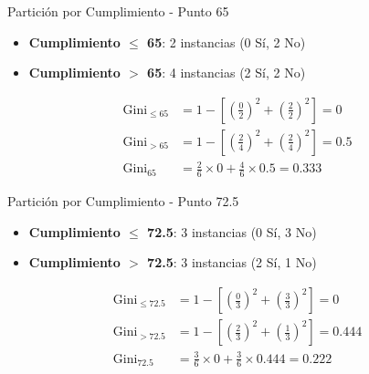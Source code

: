 \documentclass{beamer}
\begin{document}
\begin{frame}{Partición por Cumplimiento - Punto 65}
    \begin{itemize}
        \item \textbf{Cumplimiento $\leq$ 65}: 2 instancias (0 Sí, 2 No)
        \item \textbf{Cumplimiento $>$ 65}: 4 instancias (2 Sí, 2 No)
    \end{itemize}
    
    \vspace{0.5em}
    
    \begin{align*}
        \mathrm{Gini}_{\leq 65} &= 1 - \left[\left(\tfrac{0}{2}\right)^2 + \left(\tfrac{2}{2}\right)^2\right] = 0 \\
        \mathrm{Gini}_{> 65} &= 1 - \left[\left(\tfrac{2}{4}\right)^2 + \left(\tfrac{2}{4}\right)^2\right] = 0.5 \\
        \mathrm{Gini}_{\text{65}} &= \tfrac{2}{6}\times0 + \tfrac{4}{6}\times0.5 = 0.333
    \end{align*}
\end{frame}

\begin{frame}{Partición por Cumplimiento - Punto 72.5}
    \begin{itemize}
        \item \textbf{Cumplimiento $\leq$ 72.5}: 3 instancias (0 Sí, 3 No)
        \item \textbf{Cumplimiento $>$ 72.5}: 3 instancias (2 Sí, 1 No)
    \end{itemize}
    
    \vspace{0.5em}
    
    \begin{align*}
        \mathrm{Gini}_{\leq 72.5} &= 1 - \left[\left(\tfrac{0}{3}\right)^2 + \left(\tfrac{3}{3}\right)^2\right] = 0 \\
        \mathrm{Gini}_{> 72.5} &= 1 - \left[\left(\tfrac{2}{3}\right)^2 + \left(\tfrac{1}{3}\right)^2\right] = 0.444 \\
        \mathrm{Gini}_{\text{72.5}} &= \tfrac{3}{6}\times0 + \tfrac{3}{6}\times0.444 = 0.222
    \end{align*}
\end{frame}
\end{document}
